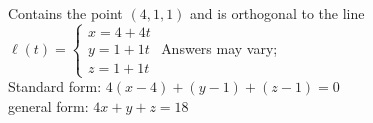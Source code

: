 {Contains the point $(4,1,1)$ and is orthogonal to the line\\
$\ell(t) = \begin{cases}x=4+4t\\y=1+1t\\z=1+1t\end{cases}$
}
{Answers may vary;\\
Standard form: $4(x-4)+(y-1)+(z-1)=0$\\
general form: $4x+y+z=18$
}

